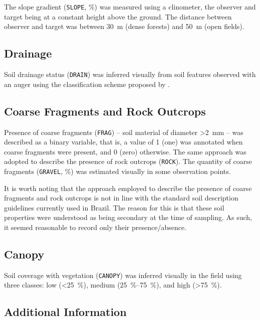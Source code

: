 The slope gradient (\texttt{SLOPE}, \si{\percent}) was measured using a clinometer, the observer and target 
being at a constant height above the ground. The distance between observer and target was between 
\SI{30}{\metre} (dense forests) and \SI{50}{\metre} (open fields).

\subsection{Drainage}

Soil drainage status (\texttt{DRAIN}) was inferred visually from soil features observed with an auger using 
the 
classification scheme proposed by .

\subsection{Coarse Fragments and Rock Outcrops}

Presence of coarse fragments (\texttt{FRAG}) -- soil material of diameter \SI{>2}{\milli\metre} -- was 
described as a binary variable, that is, a value of \num{1} (one) was annotated when coarse fragments were 
present, and \num{0} (zero) otherwise. The same approach was adopted to describe the presence of rock outcrops 
(\texttt{ROCK}). The quantity of coarse fragments (\texttt{GRAVEL}, \si{\percent}) was estimated visually in 
some observation points.

It is worth noting that the approach employed to describe the presence of coarse fragments and rock outcrops is 
not in line with the standard soil description guidelines currently used in Brazil. The reason for this is that 
these soil properties were understood as being secondary at the time of sampling. As such, it seemed reasonable 
to record only their presence/absence.

\subsection{Canopy}

Soil coverage with vegetation (\texttt{CANOPY}) was inferred visually in the field using three classes: low 
(\SI{<25}{\percent}), medium (\SIrange{25}{75}{\percent}), and high (\SI{>75}{\percent}).

\subsection{Additional Information}

